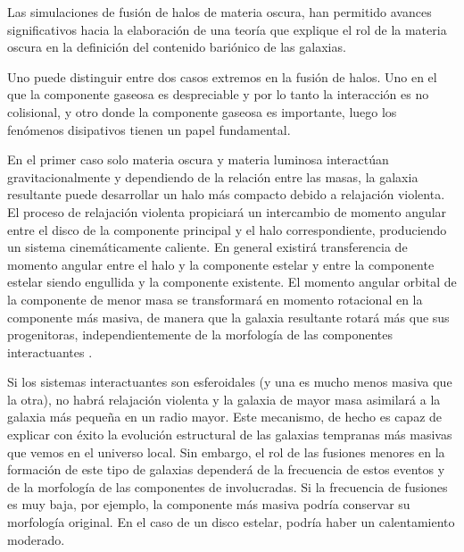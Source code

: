\documentclass{article}
\begin{document}
\begin{description}
Las simulaciones de fusión de halos de materia oscura, han permitido avances significativos hacia la
elaboración de una teoría que explique el rol de la materia oscura en la definición del contenido
bariónico de las galaxias.

Uno puede distinguir entre dos casos extremos en la fusión de halos. Uno en el que la componente
gaseosa es despreciable y por lo tanto la interacción es no colisional, y otro donde la componente
gaseosa es importante, luego los fenómenos disipativos tienen un papel fundamental.

En el primer caso solo materia oscura y materia luminosa interactúan gravitacionalmente y
dependiendo de la relación entre las masas, la galaxia resultante puede desarrollar un halo más
compacto debido a relajación violenta. El proceso de relajación violenta propiciará un intercambio
de momento angular entre el disco de la componente principal y el halo correspondiente, produciendo
un sistema cinemáticamente caliente. En general existirá transferencia de momento angular entre el
halo y la componente estelar y entre la componente estelar siendo engullida y la componente
existente. El momento angular orbital de la componente de menor masa se transformará en momento
rotacional en la componente más masiva, de manera que la galaxia resultante rotará más que sus
progenitoras, independientemente de la morfología de las componentes interactuantes \citep{Qu2017}.

Si los sistemas interactuantes son esferoidales (y una es mucho menos masiva que la otra), no habrá
relajación violenta y la galaxia de mayor masa asimilará a la galaxia más pequeña en un radio mayor.
Este mecanismo, de hecho es capaz de explicar con éxito la evolución estructural de las galaxias
tempranas más masivas que vemos en el universo local. Sin embargo, el rol de las fusiones menores en
la formación de este tipo de galaxias dependerá de la frecuencia de estos eventos y de la morfología
de las componentes de involucradas. Si la frecuencia de fusiones es muy baja, por ejemplo, la
componente más masiva podría conservar su morfología original. En el caso de un disco estelar,
podría haber un calentamiento moderado.


\end{description}
\end{document}
